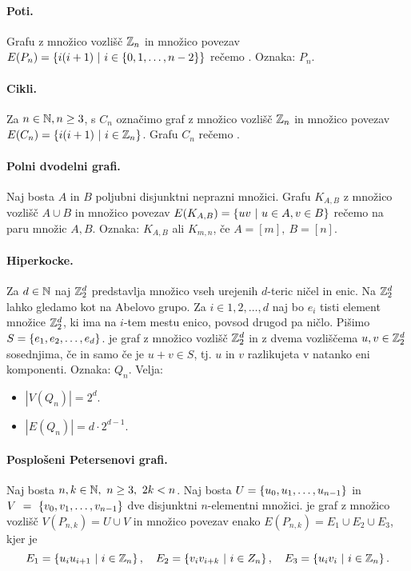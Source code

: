 \paragraph{Poti.} Grafu z množico vozlišč $\mathbb{Z}_n$ in množico povezav $E(P_n) = \left\{i(i+1) \ | \ i \in \left\{0,1, \ldots, n-2\right\}\right\}$ rečemo . Oznaka: $P_n$.

\paragraph{Cikli.} Za $n \in \mathbb{N}, n \geq 3$, s $C_n$ označimo graf z množico vozlišč $\mathbb{Z}_n$ in množico povezav $E(C_n) = \left\{i(i+1) \ | \ i \in \mathbb{Z}_n\right\}$. Grafu $C_n$ rečemo .

\paragraph{Polni dvodelni grafi.} Naj bosta $A$ in $B$ poljubni disjunktni neprazni množici. Grafu $K_{A, B}$ z množico vozlišč $A \cup B$ in množico povezav $E(K_{A,B}) = \left\{uv \ | \ u \in A, v \in B\right\}$ rečemo  na paru množic $A, B$. Oznaka: $K_{A, B}$ ali $K_{m, n}$, če $A = [m], \ B = [n]$.

\paragraph{Hiperkocke.} Za $d \in \mathbb{N}$ naj $\mathbb{Z}_2^d$ predstavlja množico vseh urejenih $d$-teric ničel in enic. Na $\mathbb{Z}_2^d$ lahko gledamo kot na Abelovo grupo. Za $i \in {1, 2, \ldots, d}$ naj bo $e_i$ tisti element množice $\mathbb{Z}_2^d$, ki ima na $i$-tem mestu enico, povsod drugod pa ničlo. Pišimo $S = \left\{e_1, e_2, \ldots, e_d\right\}$.  je graf z množico vozlišč $\mathbb{Z}_2^d$ in z dvema vozliščema $u, v \in \mathbb{Z}_2^d$ sosednjima, če in samo če je $u+ v \in S$, tj. $u$ in $v$ razlikujeta v natanko eni komponenti. Oznaka: $Q_n$. Velja:
\begin{itemize}
    \item $|V(Q_n)| = 2^d$.
    \item $|E(Q_n)| = d \cdot 2 ^{d-1}$.
\end{itemize}

\paragraph{Posplošeni Petersenovi grafi.} Naj bosta $n, k \in \mathbb{N}, \ n \geq 3, \ 2k < n$. Naj bosta $U = \left\{u_0, u_1, \ldots, u_{n-1}\right\}$ in $V~=~\left\{v_0, v_1, \ldots, v_{n-1}\right\}$ dve disjunktni $n$-elementni množici.  je graf z množico vozlišč $V(P_{n,k}) = U \cup V$ in množico povezav enako $E(P_{n,k}) = E_1 \cup E_2 \cup E_3$, kjer je 
$$E_1 = \left\{u_iu_{i+1} \ | \ i \in \mathbb{Z}_n\right\}, \quad E_2 = \left\{v_iv_{i+k} \ | \ i \in Z_n\right\}, \quad E_3 = \left\{u_iv_i \ | \ i \in \mathbb{Z}_n\right\}.$$


